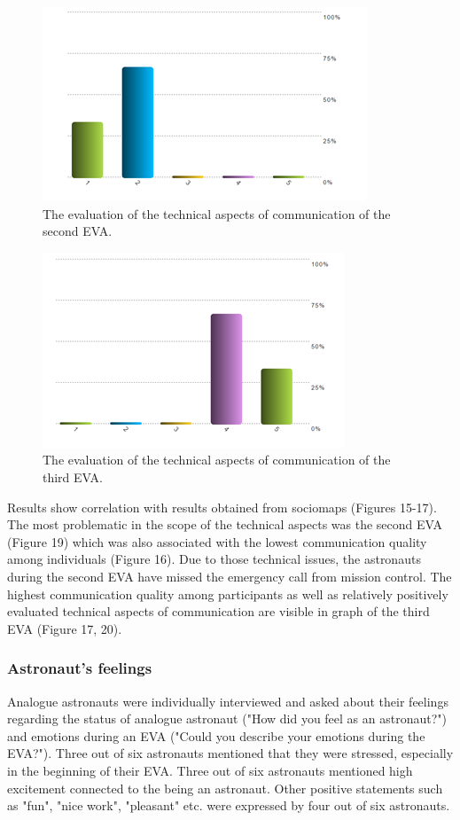 \documentclass[preprint]{elsarticle}
\begin{document}
\begin{figure}
\centering
\includegraphics{img/figure19.png}
\caption{The evaluation of the technical aspects of communication of the second EVA.}
\end{figure}

\begin{figure}
\centering
\includegraphics{img/figure20.png}
\caption{The evaluation of the technical aspects of communication of the third EVA.}
\end{figure}

Results show correlation with results obtained from sociomaps (Figures 15-17). The most problematic in the scope of the technical aspects was the second EVA (Figure 19) which was also associated with the lowest communication quality among individuals (Figure 16). Due to those technical issues, the astronauts during the second EVA have missed the emergency call from mission control. The highest communication quality among participants as well as relatively positively evaluated technical aspects of communication are visible in graph of the third EVA (Figure 17, 20).

\subsubsection{Astronaut's feelings}
Analogue astronauts were individually interviewed and asked about their feelings regarding the status of analogue astronaut ("How did you feel as an astronaut?") and emotions during an EVA ("Could you describe your emotions during the EVA?"). Three out of six astronauts mentioned that they were stressed, especially in the beginning of their EVA. Three out of six astronauts mentioned high excitement connected to the being an astronaut. Other positive statements such as "fun", "nice work", "pleasant" etc. were expressed by four out of six astronauts.
\end{document}
